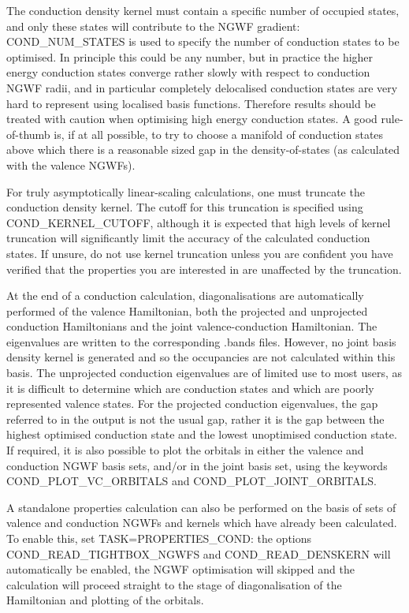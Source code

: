 \documentclass[letterpaper,10pt,english]{sphinxmanual}
\begin{document}
The conduction density kernel must contain a specific number of occupied
states, and only these states will contribute to the NGWF gradient:
COND\_NUM\_STATES is used to specify the number of conduction states to
be optimised. In principle this could be any number, but in practice the
higher energy conduction states converge rather slowly with respect to
conduction NGWF radii, and in particular completely delocalised
conduction states are very hard to represent using localised basis
functions. Therefore results should be treated with caution when
optimising high energy conduction states. A good rule-of-thumb is, if at
all possible, to try to choose a manifold of conduction states above
which there is a reasonable sized gap in the density-of-states (as
calculated with the valence NGWFs).

For truly asymptotically linear-scaling calculations, one must truncate
the conduction density kernel. The cutoff for this truncation is
specified using COND\_KERNEL\_CUTOFF, although it is expected that high
levels of kernel truncation will significantly limit the accuracy of the
calculated conduction states. If unsure, do not use kernel truncation
unless you are confident you have verified that the properties you are
interested in are unaffected by the truncation.

At the end of a conduction calculation, diagonalisations are
automatically performed of the valence Hamiltonian, both the projected
and unprojected conduction Hamiltonians and the joint valence-conduction
Hamiltonian. The eigenvalues are written to the corresponding .bands
files. However, no joint basis density kernel is generated and so the
occupancies are not calculated within this basis. The unprojected
conduction eigenvalues are of limited use to most users, as it is
difficult to determine which are conduction states and which are poorly
represented valence states. For the projected conduction eigenvalues,
the gap referred to in the output is not the usual gap, rather it is the
gap between the highest optimised conduction state and the lowest
unoptimised conduction state. If required, it is also possible to plot
the orbitals in either the valence and conduction NGWF basis sets,
and/or in the joint basis set, using the keywords
COND\_PLOT\_VC\_ORBITALS and COND\_PLOT\_JOINT\_ORBITALS.

A standalone properties calculation can also be performed on the basis
of sets of valence and conduction NGWFs and kernels which have already
been calculated. To enable this, set TASK=PROPERTIES\_COND: the options
COND\_READ\_TIGHTBOX\_NGWFS and COND\_READ\_DENSKERN will automatically
be enabled, the NGWF optimisation will skipped and the calculation will
proceed straight to the stage of diagonalisation of the Hamiltonian and
plotting of the orbitals.
\end{document}
